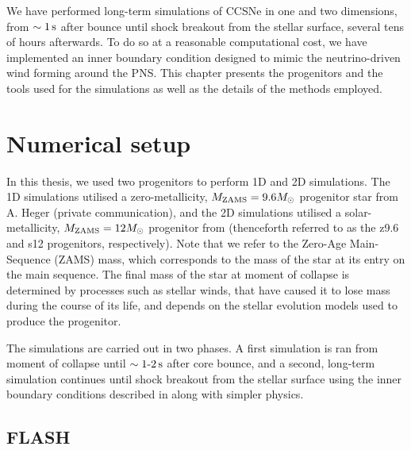  \label{chap:methods}


We have performed long-term simulations of CCSNe in one and two dimensions, from \(\sim1\,\mathrm{s}\) after bounce until shock breakout from the stellar surface, several tens of hours afterwards. To do so at a reasonable computational cost, we have implemented an inner boundary condition designed to mimic the neutrino-driven wind forming around the PNS. This chapter presents the progenitors and the tools used for the simulations as well as the details of the methods employed.

\section{Numerical setup} \label{sec:setup}

In this thesis, we used two progenitors to perform 1D and 2D simulations. The 1D simulations utilised a zero-metallicity, \(M_\mathrm{ZAMS} = 9.6M_{\odot}\) progenitor star from A. Heger (private communication), and the 2D simulations utilised a solar-metallicity, \(M_\mathrm{ZAMS} = 12M_{\odot}\) progenitor from \cite{Woosley2007} (thenceforth referred to as the z9.6 and s12 progenitors, respectively). Note that we refer to the Zero-Age Main-Sequence (ZAMS) mass, which corresponds to the mass of the star at its entry on the main sequence. The final mass of the star at moment of collapse is determined by processes such as stellar winds, that have caused it to lose mass during the course of its life, and depends on the stellar evolution models used to produce the progenitor.

The simulations are carried out in two phases. A first simulation is ran from moment of collapse until \(\sim1\text{-}2\,\mathrm{s}\) after core bounce, and a second, long-term simulation continues until shock breakout from the stellar surface using the inner boundary conditions described in  along with simpler physics. 

\subsection{FLASH}

